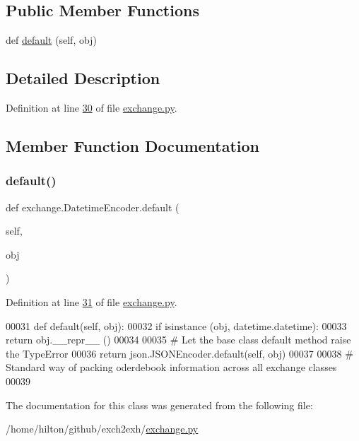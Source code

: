 \subsection*{Public Member Functions}
\begin{DoxyCompactItemize}
\item 
def \hyperlink{classexchange_1_1_datetime_encoder_a0bb4f94a13ce6c33e8d68869e282d24f}{default} (self, obj)
\end{DoxyCompactItemize}


\subsection{Detailed Description}


Definition at line \hyperlink{exchange_8py_source_l00030}{30} of file \hyperlink{exchange_8py_source}{exchange.\+py}.



\subsection{Member Function Documentation}
\mbox{\label{classexchange_1_1_datetime_encoder_a0bb4f94a13ce6c33e8d68869e282d24f}} 
\subsubsection{\texorpdfstring{default()}{default()}}
{\footnotesize\ttfamily def exchange.\+Datetime\+Encoder.\+default (\begin{DoxyParamCaption}\item[{}]{self,  }\item[{}]{obj }\end{DoxyParamCaption})}



Definition at line \hyperlink{exchange_8py_source_l00031}{31} of file \hyperlink{exchange_8py_source}{exchange.\+py}.


\begin{DoxyCode}
00031     \textcolor{keyword}{def }default(self, obj):
00032         \textcolor{keywordflow}{if} isinstance (obj, datetime.datetime):
00033             \textcolor{keywordflow}{return} obj.\_\_repr\_\_ ()
00034             
00035         \textcolor{comment}{# Let the base class default method raise the TypeError}
00036         \textcolor{keywordflow}{return} json.JSONEncoder.default(self, obj)
00037 
00038 \textcolor{comment}{# Standard way of packing oderdebook information across all exchange classes}
00039         
\end{DoxyCode}


The documentation for this class was generated from the following file\+:\begin{DoxyCompactItemize}
\item 
/home/hilton/github/exch2exh/\hyperlink{exchange_8py}{exchange.\+py}\end{DoxyCompactItemize}
